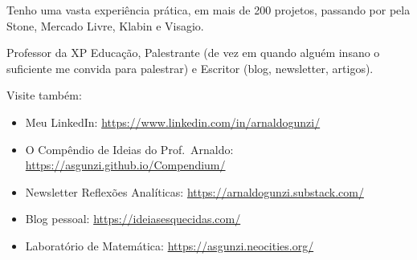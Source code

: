\documentclass[
  letterpaper,
  DIV=11,
  numbers=noendperiod]{scrreprt}
\begin{document}
Tenho uma vasta experiência prática, em mais de 200 projetos, passando
por pela Stone, Mercado Livre, Klabin e Visagio.

Professor da XP Educação, Palestrante (de vez em quando alguém insano o
suficiente me convida para palestrar) e Escritor (blog, newsletter,
artigos).

Visite também:

\begin{itemize}
\item
  Meu LinkedIn: \url{https://www.linkedin.com/in/arnaldogunzi/}
\item
  O Compêndio de Ideias do Prof.~Arnaldo:
  \url{https://asgunzi.github.io/Compendium/}
\item
  Newsletter Reflexões Analíticas:
  \url{https://arnaldogunzi.substack.com/}
\item
  Blog pessoal: \url{https://ideiasesquecidas.com/}
\item
  Laboratório de Matemática: \url{https://asgunzi.neocities.org/}
\end{itemize}
\end{document}
